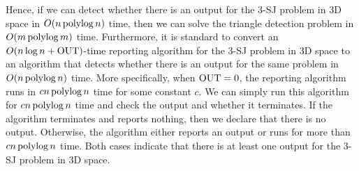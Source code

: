 Hence, if we can detect whether there is an output for the 3-SJ problem in 3D space in $O(n\operatorname*{polylog} n)$ time, then we can solve the triangle detection problem 
in $O(m \operatorname*{polylog} m)$ time. Furthermore, it is standard to convert an $O(n \log n + \mathrm{OUT})$-time reporting algorithm for the 3-SJ problem in 3D space to an algorithm that detects whether there is an output for the same problem in $O(n \operatorname*{polylog} n)$ time. More specifically, when $\mathrm{OUT} = 0$, the reporting algorithm runs in $cn\operatorname*{polylog} n$ time for some constant $c$. We can simply run this algorithm for $cn\operatorname*{polylog} n$ time and check the output and whether it terminates. If the algorithm terminates and reports nothing, then we declare that there is no output. Otherwise, the algorithm either reports an output or runs for more than $cn\operatorname*{polylog} n$ time. Both cases indicate that there is at least one output for the 3-SJ problem in 3D space.  